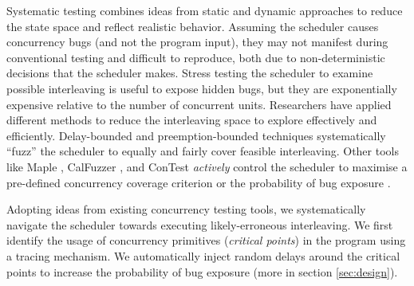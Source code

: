 %

Systematic testing combines ideas from static and dynamic approaches to reduce the state space and reflect realistic behavior.
%
Assuming the scheduler causes concurrency bugs (and not the program input), they may not manifest during conventional testing and difficult to reproduce, both due to non-deterministic decisions that the scheduler makes.
%
Stress testing the scheduler to examine possible interleaving is useful to expose hidden bugs, but they are exponentially expensive relative to the number of concurrent units.
%
Researchers have applied different methods \cite{thomson-concurrencyTesting-ppopp14} to reduce the interleaving space to explore effectively and efficiently.
%
Delay-bounded \cite{emmi-delayBounded-popl11,burckhardt-depthBug-asplos10} and preemption-bounded \cite{madanlal-preemptionBound-pldi07} techniques systematically ``fuzz'' the scheduler to equally and fairly cover feasible interleaving.
%
Other tools like Maple \cite{yu-maple-oopsla12}, CalFuzzer \cite{joshi-calfuzzer},  and ConTest \cite{contest-jgi01,edelstein2003contest} \textit{actively} control the scheduler to maximise a pre-defined concurrency coverage criterion \cite{hong-syncTesting-issta12} or the probability of bug exposure \cite{burckhardt-depthBug-asplos10}.

Adopting ideas from existing concurrency testing tools, we systematically navigate the scheduler towards executing likely-erroneous interleaving.
%
We first identify the usage of concurrency primitives (\textit{critical points}) in the program using a tracing mechanism.
%
We automatically inject random delays around the critical points to increase the probability of bug exposure (more in section \ref{sec:design}).
